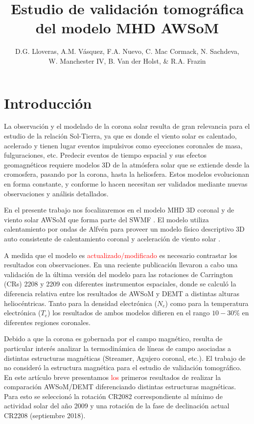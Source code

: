 \documentclass[baaa]{baaa}
\title{Estudio de validación tomográfica del modelo MHD AWSoM}
\author{D.G. Lloveras\inst{1}, A.M. Vásquez\inst{1}, F.A. Nuevo\inst{1}, C. Mac Cormack\inst{1}, N. Sachdeva\inst{2},\\ W. Manchester IV\inst{2}, B. Van der Holst\inst{2}, \& R.A. Frazin\inst{2}}
\institute{
Insituto de Astronomía y Física del Espacio, CONICET--UBA, Argentina \and
Climate and Space Sciences and Engineering, Universidad de Michigan, EEUU.
}
\begin{document}
\maketitle

\section{Introducción}
\label{S_intro}
La observación y el modelado de la corona solar resulta de gran relevancia para el estudio de la relación Sol-Tierra, ya que es donde el viento solar es calentado, acelerado y tienen lugar eventos impulsivos como eyecciones coronales de masa, fulguraciones, etc. Predecir eventos de tiempo espacial y sus efectos geomagnéticos requiere modelos 3D de la atmósfera solar que se extiende desde la cromosfera, pasando por la corona, hasta la heliosfera. Estos modelos evolucionan en forma constante, y conforme lo hacen necesitan ser validados mediante nuevas observaciones y análisis detallados.

En el presente trabajo nos focalizaremos en el modelo MHD 3D coronal y de viento solar AWSoM que forma parte del SWMF \citet{Toth_2012}. El modelo utiliza calentamiento por ondas de Alfvén para proveer un modelo físico descriptivo 3D auto consistente de calentamiento coronal y aceleración de viento solar \citep{sokolov_2013}  \citep{vander_2014}.

A medida que el modelo es \textcolor{red}{actualizado/modificado} es necesario contrastar los resultados con observaciones. En una reciente publicación \citet{sachdeva_2019} llevaron a cabo una validación de la última versión del modelo para las rotaciones de Carrington (CRs) 2208 y 2209 con diferentes instrumentos espaciales, donde se calculó la diferencia relativa entre los resultados de AWSoM y DEMT a distintas alturas heliocéntricas. Tanto para la densidad electrónica ($N_e$) como para la temperatura electrónica ($T_e$) los resultados de ambos modelos difieren en el rango $10-30\%$ en diferentes regiones coronales.


Debido a que la corona es gobernada por el campo magnético, resulta de particular interés analizar la termodinámica de líneas de campo asociadas a distintas estructuras magnéticas (Streamer, Agujero coronal, etc.). El trabajo de \citet{sachdeva_2019} no consideró la estructura magnética para el estudio de validación tomográfico. En este artículo breve presentamos \textcolor{red}{los} primeros resultados de realizar la comparación AWSoM/DEMT diferenciando distintas estructuras magnéticas. Para esto se seleccionó la rotación CR2082 correspondiente al mínimo de actividad solar del año 2009 y una rotación de la fase de  declinación actual CR2208 (septiembre 2018).
\end{document}
